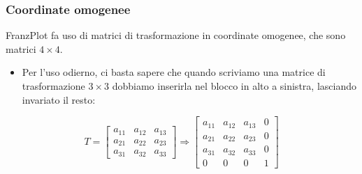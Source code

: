\documentclass{beamer}
\newcommand{\frnzplt}{FranzPlot }
\begin{document}
\begin{frame}
\frametitle{Coordinate omogenee}
\frnzplt fa uso di matrici di trasformazione in coordinate omogenee, che sono matrici $4 \times 4$.
    \begin{itemize}
        \item Per l'uso odierno, ci basta sapere che quando scriviamo una matrice di trasformazione $3 \times 3$
            dobbiamo inserirla nel blocco in alto a sinistra, lasciando invariato il resto:
    \end{itemize}
\begin{displaymath}
    T = 
\begin{bmatrix}
a_{11} & a_{12} & a_{13} \\
a_{21} & a_{22} & a_{23} \\
a_{31} & a_{32} & a_{33}
\end{bmatrix}
\Rightarrow
\begin{bmatrix}
a_{11} & a_{12} & a_{13} & 0 \\
a_{21} & a_{22} & a_{23} & 0 \\
a_{31} & a_{32} & a_{33} & 0 \\
0      &    0   &  0     & 1 
\end{bmatrix}
\end{displaymath}
\end{frame}
\end{document}
